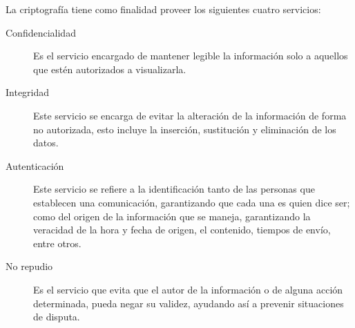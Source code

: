 %
%

La criptografía tiene como finalidad proveer los siguientes cuatro servicios:

\begin{description}

  \item[Confidencialidad]
    Es el servicio encargado de mantener legible la información solo a
    aquellos que estén autorizados a visualizarla.

  \item[Integridad]
    Este servicio se encarga de evitar la alteración de la información de
    forma no autorizada, esto incluye la inserción, sustitución y
    eliminación de los datos.

  \item[Autenticación]
    Este servicio se refiere a la identificación tanto de las personas que
    establecen una comunicación, garantizando que cada una es quien dice
    ser; como del origen de la información que se maneja, garantizando la
    veracidad de la hora y fecha de origen, el contenido, tiempos de
    envío, entre otros.

  \item[No repudio]
    Es el servicio que evita que el autor de la información o de alguna
    acción determinada, pueda negar su validez, ayudando así a prevenir
    situaciones de disputa.

\end{description}
